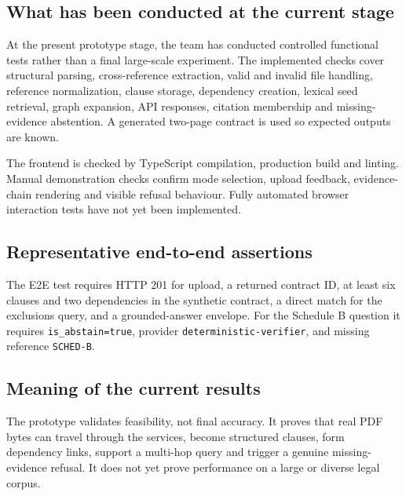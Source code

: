 \documentclass[11pt,letterpaper]{article}
\begin{document}
\subsection{What has been conducted at the current stage}
At the present prototype stage, the team has conducted controlled functional tests rather than a final large-scale experiment. The implemented checks cover structural parsing, cross-reference extraction, valid and invalid file handling, reference normalization, clause storage, dependency creation, lexical seed retrieval, graph expansion, API responses, citation membership and missing-evidence abstention. A generated two-page contract is used so expected outputs are known.

The frontend is checked by TypeScript compilation, production build and linting. Manual demonstration checks confirm mode selection, upload feedback, evidence-chain rendering and visible refusal behaviour. Fully automated browser interaction tests have not yet been implemented.

\subsection{Representative end-to-end assertions}
The E2E test requires HTTP 201 for upload, a returned contract ID, at least six clauses and two dependencies in the synthetic contract, a direct match for the exclusions query, and a grounded-answer envelope. For the Schedule B question it requires \texttt{is\_abstain=true}, provider \texttt{deterministic-verifier}, and missing reference \texttt{SCHED-B}.

\subsection{Meaning of the current results}
The prototype validates feasibility, not final accuracy. It proves that real PDF bytes can travel through the services, become structured clauses, form dependency links, support a multi-hop query and trigger a genuine missing-evidence refusal. It does not yet prove performance on a large or diverse legal corpus.
\end{document}
